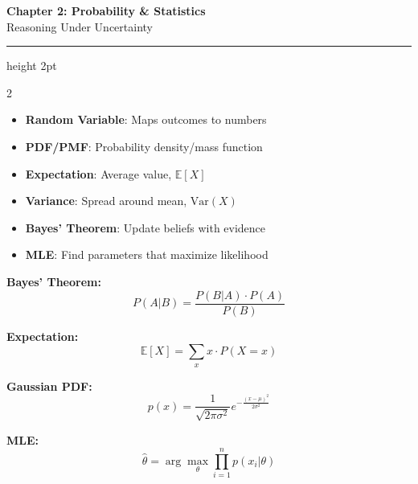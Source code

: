 \documentclass[11pt,letterpaper]{article}
\begin{document}
\begin{center}
{\LARGE\bfseries\color{primaryblue} Chapter 2: Probability \& Statistics}\\[3pt]
{\large Reasoning Under Uncertainty}
\end{center}
\vspace{-5pt}
\hrule height 2pt
\vspace{8pt}

\begin{multicols}{2}

\begin{tcolorbox}[conceptbox, title={\faLightbulb\ Key Concepts}]
\begin{itemize}
    \item \textbf{Random Variable}: Maps outcomes to numbers
    \item \textbf{PDF/PMF}: Probability density/mass function
    \item \textbf{Expectation}: Average value, $\mathbb{E}[X]$
    \item \textbf{Variance}: Spread around mean, $\text{Var}(X)$
    \item \textbf{Bayes' Theorem}: Update beliefs with evidence
    \item \textbf{MLE}: Find parameters that maximize likelihood
\end{itemize}
\end{tcolorbox}

\begin{tcolorbox}[formulabox, title={\faCalculator\ Core Formulas}]
\textbf{Bayes' Theorem:}
\[ P(A|B) = \frac{P(B|A) \cdot P(A)}{P(B)} \]

\textbf{Expectation:}
\[ \mathbb{E}[X] = \sum_x x \cdot P(X=x) \]

\textbf{Gaussian PDF:}
\[ p(x) = \frac{1}{\sqrt{2\pi\sigma^2}} e^{-\frac{(x-\mu)^2}{2\sigma^2}} \]

\textbf{MLE:}
\[ \hat{\theta} = \arg\max_\theta \prod_{i=1}^{n} p(x_i | \theta) \]
\end{tcolorbox}

\columnbreak

\begin{center}
\end{center}
\end{multicols}
\end{document}
